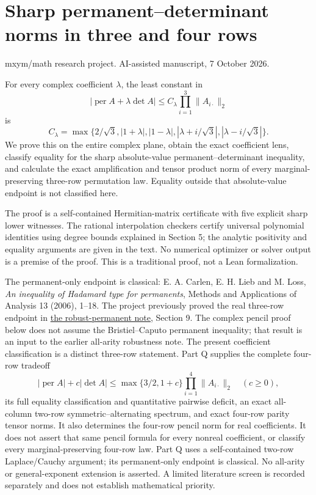 \documentclass[
  11pt,
]{article}
\author{}
\date{}
\begin{document}
\section{Sharp permanent--determinant norms in three and four
rows}\label{sharp-permanentdeterminant-norms-in-three-and-four-rows}

mxym/math research project. AI-assisted manuscript, 7 October 2026.

For every complex coefficient \(\lambda\), the least constant in \[
|\operatorname{per} A+\lambda\det A|
\le C_\lambda\prod_{i=1}^3\|A_{i\cdot}\|_2
\] is \[
C_\lambda=\max\{2/\sqrt3,|1+\lambda|,|1-\lambda|,
                         |\lambda+i/\sqrt3|,|\lambda-i/\sqrt3|\}.
\] We prove this on the entire complex plane, obtain the exact
coefficient lens, classify equality for the sharp absolute-value
permanent--determinant inequality, and calculate the exact amplification
and tensor product norm of every marginal-preserving three-row
permutation law. Equality outside that absolute-value endpoint is not
classified here.

The proof is a self-contained Hermitian-matrix certificate with five
explicit sharp lower witnesses. The rational interpolation checkers
certify universal polynomial identities using degree bounds explained in
Section 5; the analytic positivity and equality arguments are given in
the text. No numerical optimizer or solver output is a premise of the
proof. This is a traditional proof, not a Lean formalization.

The permanent-only endpoint is classical: E. A. Carlen, E. H. Lieb and
M. Loss, \emph{An inequality of Hadamard type for permanents}, Methods
and Applications of Analysis 13 (2006), 1--18. The project previously
proved the real three-row endpoint in
\href{../../notes/sharp-robust-permanent/paper.md}{the robust-permanent
note}, Section 9. The complex pencil proof below does not assume the
Bristiel--Caputo permanent inequality; that result is an input to the
earlier all-arity robustness note. The present coefficient
classification is a distinct three-row statement. Part Q supplies the
complete four-row tradeoff \[
|\operatorname{per}A|+c|\det A|
\le\max\{3/2,1+c\}\prod_{i=1}^4\|A_{i\cdot}\|_2\quad(c\ge0),
\] its full equality classification and quantitative pairwise deficit,
an exact all-column two-row symmetric--alternating spectrum, and exact
four-row parity tensor norms. It also determines the four-row pencil
norm for real coefficients. It does not assert that same pencil formula
for every nonreal coefficient, or classify every marginal-preserving
four-row law. Part Q uses a self-contained two-row Laplace/Cauchy
argument; its permanent-only endpoint is classical. No all-arity or
general-exponent extension is asserted. A limited literature screen is
recorded separately and does not establish mathematical priority.
\end{document}
